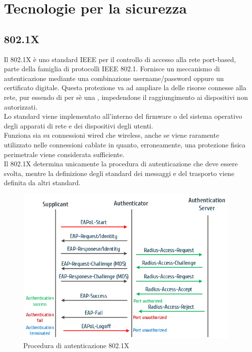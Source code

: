 \documentclass[Tesi.tex]{subfiles}
\begin{document}
\newpage
\section{Tecnologie per la sicurezza}
\subsection{802.1X}
Il 802.1X è uno standard IEEE per il controllo di accesso alla rete port-based, parte della famiglia di protocolli IEEE 802.1. Fornisce un meccanismo di autenticazione mediante una combinazione username/password oppure un certificato digitale.
Questa protezione va ad ampliare la  delle risorse connesse alla rete, pur essendo di per sè una , impedendone il raggiungimento ai dispositivi non autorizzati. \\
Lo standard viene implementato all'interno del firmware o del sistema operativo degli apparati di rete e dei dispositivi degli utenti.\\
Funziona sia su connessioni wired che wireless, anche se viene raramente utilizzato nelle connessioni cablate in quanto, erroneamente, una protezione fisica perimetrale viene considerata sufficiente. \\
Il 802.1X determina unicamente la procedura di autenticazione che deve essere svolta, mentre la definizione degli standard dei messaggi e del trasporto viene definita da altri standard.

\begin{figure}[H]
	\centering
	\includegraphics[width=0.78\linewidth]{"images/8021x-Authentication-message-flow"}
	\caption{Procedura di autenticazione 802.1X}
	\label{fig:Procedura di autenticazione 802.1X}
\end{figure}
\end{document}
